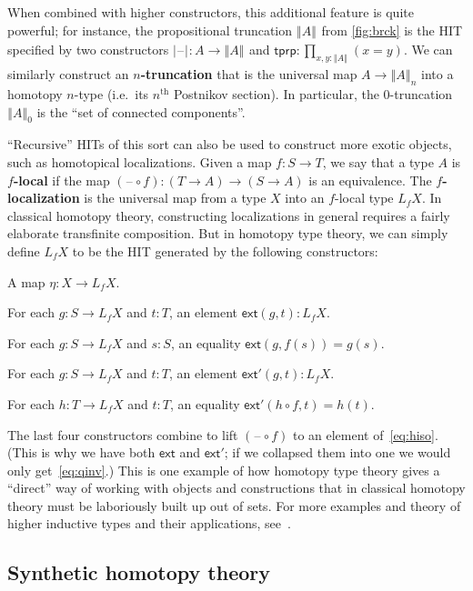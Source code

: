 \documentclass[10pt]{article}
\def\tprod{\textstyle\prod}
\newcommand{\blank}{\mathord{\hspace{1pt}\text{--}\hspace{1pt}}}
\numberwithin{equation}{section}
\newcommand{\trunc}[2]{\mathopen{}\left\Vert #2\right\Vert_{#1}\mathclose{}}
\newcommand{\tproj}[3][]{\mathopen{}\left|#3\right|_{#2}^{#1}\mathclose{}}
\newcommand{\brck}[1]{\trunc{}{#1}}
\newcommand{\bproj}[1]{\tproj{}{#1}}
\begin{document}
When combined with higher constructors, this additional feature is quite powerful; for instance, the propositional truncation $\brck{A}$ from \cref{fig:brck} is the HIT specified by two constructors $\bproj{\blank} : A\to\brck{A}$ and $\mathsf{tprp}:\tprod_{x,y:\brck{A}} (x=y)$.
We can similarly construct an \textbf{$n$-truncation} that is the universal map $A\to \trunc n A$ into a homotopy $n$-type (i.e.\ its $n^{\mathrm{th}}$ Postnikov section).
In particular, the $0$-truncation $\trunc 0 A$ is the ``set of connected components''. %

``Recursive'' HITs of this sort can also be used to construct more exotic objects, such as homotopical localizations.
Given a map $f:S\to T$, we say that a type $A$ is \textbf{$f$-local} if the map $(\blank\circ f):(T\to A)\to (S\to A)$ is an equivalence.
The \textbf{$f$-localization} is the universal map from a type $X$ into an $f$-local type $L_f X$.
In classical homotopy theory, constructing localizations in general requires a fairly elaborate transfinite composition.
But in homotopy type theory, we can simply define $L_f X$ to be the HIT generated by the following constructors:
\begin{compactitem}
\item A map $\eta : X\to L_f X$.
\item For each $g:S\to L_f X$ and $t:T$, an element $\mathsf{ext}(g,t):L_f X$.
\item For each $g:S\to L_f X$ and $s:S$, an equality $\mathsf{ext}(g,f(s)) = g(s)$.
\item For each $g:S\to L_f X$ and $t:T$, an element $\mathsf{ext}'(g,t):L_f X$.
\item For each $h:T\to L_f X$ and $t:T$, an equality $\mathsf{ext}'(h\circ f,t)=h(t)$.
\end{compactitem}
The last four constructors combine to lift $(\blank\circ f)$ to an element of~\eqref{eq:hiso}.  (This is why we have both $\mathsf{ext}$ and $\mathsf{ext}'$; if we collapsed them into one we would only get~\eqref{eq:qinv}.)
This is one example of how homotopy type theory gives a ``direct'' way of working with objects and constructions that in classical homotopy theory must be laboriously built up out of sets.
For more examples and theory of higher inductive types and their applications, see~\cite[Chapter 6]{hottbook}.


\subsection{Synthetic homotopy theory}
\label{sec:synth-homot-theory}
\end{document}
